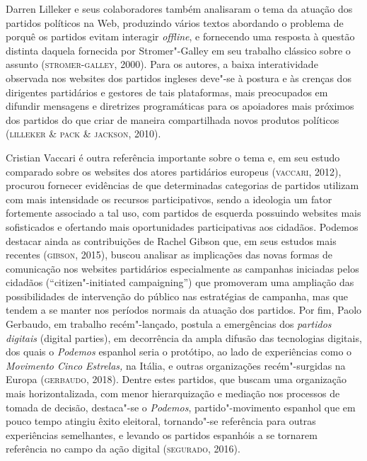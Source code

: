 Darren Lilleker e seus colaboradores também analisaram o tema da atuação
dos partidos políticos na Web, produzindo vários textos abordando o
problema de porquê os partidos evitam interagir \emph{offline}, e fornecendo
uma resposta à questão distinta daquela fornecida por Stromer"-Galley em
seu trabalho clássico sobre o assunto (\textsc{stromer}-\textsc{galley}, 2000). Para os
autores, a baixa interatividade observada nos websites dos partidos
ingleses deve"-se à postura e às crenças dos dirigentes partidários e
gestores de tais plataformas, mais preocupados em difundir mensagens e
diretrizes programáticas para os apoiadores mais próximos dos partidos
do que criar de maneira compartilhada novos produtos políticos (\textsc{lilleker}
\& \textsc{pack} \& \textsc{jackson}, 2010).

Cristian Vaccari é outra referência importante sobre o tema e, em seu
estudo comparado sobre os websites dos atores partidários europeus
(\textsc{vaccari}, 2012), procurou fornecer evidências de que determinadas
categorias de partidos utilizam com mais intensidade os recursos
participativos, sendo a ideologia um fator fortemente associado a tal
uso, com partidos de esquerda possuindo websites mais sofisticados e
ofertando mais oportunidades participativas aos cidadãos. Podemos
destacar ainda as contribuições de Rachel Gibson que, em seus estudos
mais recentes (\textsc{gibson}, 2015), buscou analisar as implicações das novas
formas de comunicação nos websites partidários especialmente as
campanhas iniciadas pelos cidadãos (``citizen"-initiated campaigning'')
que promoveram uma ampliação das possibilidades de intervenção do
público nas estratégias de campanha, mas que tendem a se manter nos
períodos normais da atuação dos partidos. Por fim, Paolo Gerbaudo, em
trabalho recém"-lançado, postula a emergências dos \emph{partidos
digitais} (digital parties), em decorrência da ampla difusão das
tecnologias digitais, dos quais o \emph{Podemos} espanhol seria o
protótipo, ao lado de experiências como o \emph{Movimento Cinco
Estrelas,} na Itália, e outras organizações recém"-surgidas na Europa
(\textsc{gerbaudo}, 2018). Dentre estes partidos, que buscam uma organização mais
horizontalizada, com menor hierarquização e mediação nos processos de
tomada de decisão, destaca"-se o \emph{Podemos}, partido"-movimento
espanhol que em pouco tempo atingiu êxito eleitoral, tornando"-se
referência para outras experiências semelhantes, e levando os partidos
espanhóis a se tornarem referência no campo da ação digital (\textsc{segurado},
2016).

